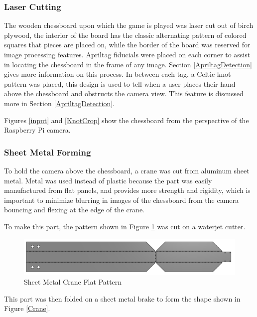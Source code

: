 \documentclass[journal]{IEEEtran}
\begin{document}
\vspace{12pt}

\subsubsection{Laser Cutting}

The wooden chessboard upon which the game is played was laser cut out of birch plywood, the interior of the board has the classic alternating pattern of colored squares that pieces are placed on, while the border of the board was reserved for image processing features. Apriltag fiducials were placed on each corner to assist in locating the chessboard in the frame of any image. Section \ref{ApriltagDetection} gives more information on this process. In between each tag, a Celtic knot pattern was placed, this design is used to tell when a user places their hand above the chessboard and obstructs the camera view. This feature is discussed more in Section \ref{ApriltagDetection}.

Figures \ref{input} and \ref{KnotCrop} show the chessboard from the perspective of the Raspberry Pi camera.

\vspace{12pt}

\subsubsection{Sheet Metal Forming}
To hold the camera above the chessboard, a crane was cut from aluminum sheet metal. Metal was used instead of plastic because the part was easily manufactured from flat panels, and provides more strength and rigidity, which is important to minimize blurring in images of the chessboard from the camera bouncing and flexing at the edge of the crane.

To make this part, the pattern shown in Figure \ref{CraneFlat} was cut on a waterjet cutter.

\begin{figure}[!ht]
	\centering
	\includegraphics[width=\linewidth]{Images/CameraCraneFlat.png}
	\caption{Sheet Metal Crane Flat Pattern}
	\label{CraneFlat}
\end{figure}

This part was then folded on a sheet metal brake to form the shape shown in Figure \ref{Crane}.
\end{document}
